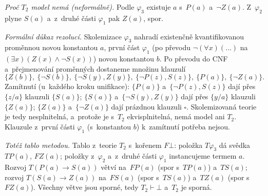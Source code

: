 \noindent\emph{Proč $T_2$ model nemá (neformálně).} Podle $\varphi_3$ existuje $a$ s~$P(a)$ a~$\neg Z(a)$. Z~$\varphi_2$ plyne $S(a)$ a~z~druhé části $\varphi_1$ pak $Z(a)$, spor.

\noindent\emph{Formální důkaz rezolucí.} Skolemizace $\varphi_3$ nahradí existenčně kvantifikovanou proměnnou novou konstantou $a$, první část $\varphi_1$ (po převodu $\neg(\forall x)(\dots)$ na $(\exists x)(Z(x)\wedge\neg S(x))$) novou konstantou $b$. Po převodu do CNF a~přejmenování proměnných dostaneme množinu klauzulí
\[
\{Z(b)\},\ \{\neg S(b)\},\ \{\neg S(y),Z(y)\},\ \{\neg P(z),S(z)\},\ \{P(a)\},\ \{\neg Z(a)\}.
\]
Zamítnutí (u~každého kroku unifikace):
$\{P(a)\}$ a~$\{\neg P(z),S(z)\}$ dají přes $\{z/a\}$ klauzuli $\{S(a)\}$;
$\{S(a)\}$ a~$\{\neg S(y),Z(y)\}$ dají přes $\{y/a\}$ klauzuli $\{Z(a)\}$;
$\{Z(a)\}$ a~$\{\neg Z(a)\}$ dají prázdnou klauzuli $\square$.
Skolemizovaná teorie je tedy nesplnitelná, a~protože je s~$T_2$ ekvisplnitelná, nemá model ani $T_2$. Klauzule z~první části $\varphi_1$ (s~konstantou $b$) k~zamítnutí potřeba nejsou.

\noindent\emph{Totéž tablo metodou.} Tablo z~teorie $T_2$ s~kořenem $F\bot$: položka $T\varphi_3$ dá svědka $TP(a)$, $F Z(a)$; položky  z~$\varphi_2$ a~z~druhé části $\varphi_1$ instancujeme termem $a$. Rozvoj $T(P(a)\to S(a))$ větví na~$FP(a)$ (spor s~$TP(a)$) a~$TS(a)$; rozvoj $T(S(a)\to Z(a))$ na~$FS(a)$ (spor s~$TS(a)$) a~$TZ(a)$ (spor s~$FZ(a)$). Všechny větve jsou sporné, tedy $T_2\vdash\bot$ a~$T_2$ je sporná.
